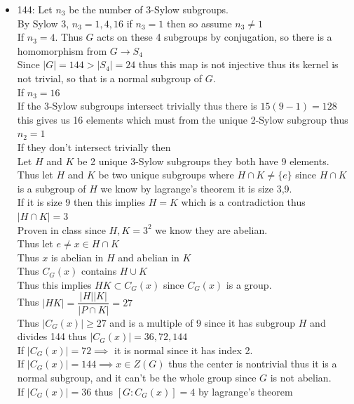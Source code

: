 \documentclass[12pt,letterpaper]{article}
\theoremstyle{definition}
\begin{document}
\begin{itemize}
    Let $n_{7}$ be the number of 7-Sylow subgroups.\\
    By Sylow 3, $n_{7}=1$ so it is normal thus done
    \item 144:
    Let $n_3$ be the number of 3-Sylow subgroups.\\
    By Sylow 3, $n_3=1,4,16$ if $n_3=1$ then so assume $n_3\neq1$\\
    If $n_3 = 4$. Thus $G$ acts on these 4 subgroups by conjugation, so there is a homomorphism from $G \rightarrow S_4$\\
    Since $|G|=144 > |S_4|=24$ thus this map is not injective thus its kernel is not trivial, so that is a normal subgroup of $G$.\\
    If $n_3 = 16$\\
    If the 3-Sylow subgroups intersect trivially thus there is $15(9-1)=128$ this gives us 16 elements which must from the unique 2-Sylow
    subgroup thus $n_2=1$\\
    If they don't intersect trivially then\\
    Let $H$ and $K$ be 2 unique 3-Sylow subgroups they both have 9 elements.
    Thus let $H$ and $K$ be two unique subgroups where $H \cap K \neq \{e\}$ since $H \cap K$ is a subgroup of $H$ we know by lagrange's theorem it is size 3,9.\\
    If it is size 9 then this implies $H=K$ which is a contradiction thus $|H \cap K|=3$\\
    Proven in class since $H,K=3^2$ we know they are abelian.\\
    Thus let $e\neq x \in H \cap K$\\
    Thus $x$ is abelian in $H$ and abelian in $K$\\
    Thus $C_G(x)$ contains $H \cup K$\\
    Thus this implies $HK \subset C_G(x)$ since $C_G(x)$ is a group.\\
    Thus $|HK|=\dfrac{|H||K|}{|P \cap K|}=27$\\
    Thus $|C_G(x)|\geq 27$ and is a multiple of 9 since it has subgroup $H$ and divides 144 thus $|C_G(x)|=36,72,144$\\
    If $|C_G(x)|=72 \implies$ it is normal since it has index 2.\\
    If $|C_G(x)|=144 \implies x\in Z(G)$ thus the center is nontrivial thus it is a normal subgroup, and it can't be the whole group since $G$ is not abelian.\\
    If $|C_G(x)|=36$ thus $[G : C_G(x)]=4$ by lagrange's theorem\\

\end{itemize}
\end{document}

